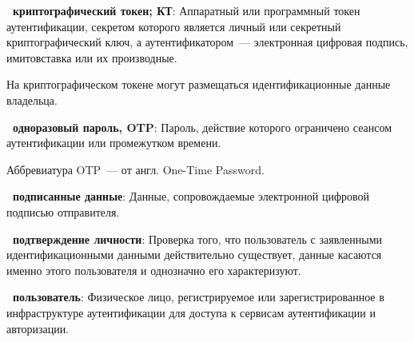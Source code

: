 {\bf \thedefctr~криптографический токен; КТ}:
Аппаратный или программный токен аутентификации, секретом которого 
является личный или секретный криптографический ключ, а аутентификатором~---  
электронная цифровая подпись, имитовставка или их производные. 

\begin{note*}
На криптографическом токене могут размещаться идентификационные данные 
владельца.
\end{note*}

{\bf \thedefctr~одноразовый пароль, OTP}: %
Пароль, действие которого ограничено сеансом аутентификации или промежутком 
времени.

\begin{note*}
Аббревиатура OTP~--- от англ. One-Time Password.
\end{note*}

{\bf \thedefctr~подписанные данные}: %
Данные, сопровождаемые электронной цифровой подписью отправителя. 

{\bf \thedefctr~подтверждение личности}:
Проверка того, что пользователь с заявленными идентификационными данными
действительно существует, данные касаются именно этого пользователя и однозначно
его характеризуют.


%





{\bf \thedefctr~пользователь}:
Физическое лицо, регистрируемое или зарегистрированное в инфраструктуре 
аутентификации для доступа к сервисам аутентификации и авторизации.
                

